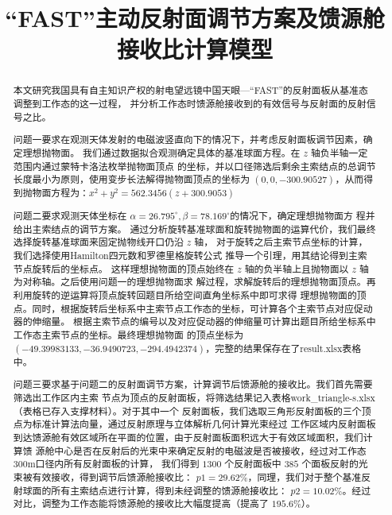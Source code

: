 \documentclass[withoutpreface,bwprint]{cumcmthesis} %
\title{“FAST”主动反射面调节方案及馈源舱接收比计算模型}
\begin{document}
\maketitle
\begin{abstract}
本文研究我国具有自主知识产权的射电望远镜中国天眼---“FAST”的反射面板从基准态调整到工作态的这一过程，
并分析工作态时馈源舱接收到的有效信号与反射面的反射信号之比。

问题一要求在观测天体发射的电磁波竖直向下的情况下，并考虑反射面板调节因素，确定理想抛物面。
我们通过数据拟合观测确定具体的基准球面方程。在 $z$ 轴负半轴一定范围内通过蒙特卡洛法枚举抛物面顶点
的坐标，并以口径筛选后剩余主索结点的总调节长度最小为原则，使用变步长法解得抛物面顶点的坐标为
$(0,0,-300.90527)$，从而得到抛物面方程为：$x^2+y^2=562.3456(z+300.9053)$

问题二要求观测天体坐标在 $\alpha =26.795^\circ,\beta =78.169^\circ$的情况下，确定理想抛物面方
程并给出主索结点的调节方案。
通过分析旋转基准球面和旋转抛物面的运算代价，我们最终选择旋转基准球面来固定抛物线开口仍沿 $z$ 轴，
对于旋转之后主索节点坐标的计算，我们选择使用Hamilton四元数\cite{Hamilton2006}和罗德里格旋转公式
推导一个引理，用其结论得到主索节点旋转后的坐标点。
这样理想抛物面的顶点始终在 $z$ 轴的负半轴上且抛物面以 $z$ 轴为对称轴。之后使用问题一的理想抛物面求
解过程，求解旋转后的理想抛物面顶点。再利用旋转的逆运算将顶点旋转回题目所给空间直角坐标系中即可求得
理想抛物面的顶点。同时，根据旋转后坐标系中主索节点工作态的坐标，可计算各个主索节点对应促动器的伸缩量。
根据主索节点的编号以及对应促动器的伸缩量可计算出题目所给坐标系中工作态主索节点的坐标。最终理想抛物面
的顶点坐标为 $(-49.39983133,-36.9490723,-294.4942374)$，完整的结果保存在了result.xlsx表格中。

问题三要求基于问题二的反射面调节方案，计算调节后馈源舱的接收比。我们首先需要筛选出工作区内主索
节点为顶点的反射面板，将筛选结果记入表格work\_triangle-s.xlsx（表格已存入支撑材料）。对于其中一个
反射面板，我们选取三角形反射面板的三个顶点为标准计算法向量，通过反射原理与立体解析几何计算光束经过
工作区域内反射面板到达馈源舱有效区域所在平面的位置，由于反射面板面积远大于有效区域面积，我们计算馈
源舱中心是否在反射后的光束中来确定反射的电磁波是否被接收，经过对工作态300m口径内所有反射面板的计算，
我们得到 $1300$ 个反射面板中 $385$ 个面板反射的光束被有效接收，得到调节后馈源舱接收比：
$p1 = 29.62\%$，同理，我们对于整个基准反射球面的所有主索结点进行计算，得到未经调整的馈源舱接收比：
$p2 = 10.02\%$。经过对比，调整为工作态能将馈源舱的接收比大幅度提高（提高了 $195.6\%$）。

\end{abstract}
\end{document}
